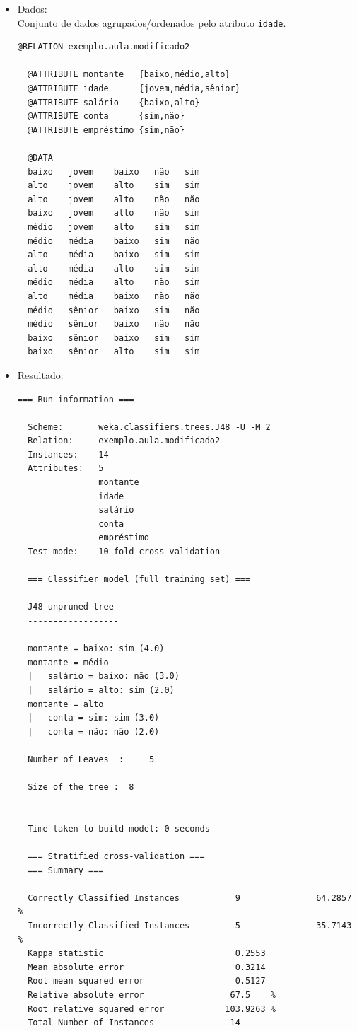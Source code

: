 \documentclass[
    article,            %
    11pt,               %
    oneside,            %
    a4paper,            %
    english,            %
    brazil,             %
    sumario=tradicional,
    ]{abntex2}
\begin{document}
\begin{itemize}
  \item Dados:\\
  Conjunto de dados agrupados/ordenados pelo atributo \texttt{idade}.
  \begin{Verbatim}[frame=single, fontsize=\tiny]
  @RELATION exemplo.aula.modificado2

  @ATTRIBUTE montante   {baixo,médio,alto}
  @ATTRIBUTE idade      {jovem,média,sênior}
  @ATTRIBUTE salário    {baixo,alto}
  @ATTRIBUTE conta      {sim,não}
  @ATTRIBUTE empréstimo {sim,não}

  @DATA
  baixo   jovem    baixo   não   sim 
  alto    jovem    alto    sim   sim 
  alto    jovem    alto    não   não 
  baixo   jovem    alto    não   sim 
  médio   jovem    alto    sim   sim 
  médio   média    baixo   sim   não 
  alto    média    baixo   sim   sim 
  alto    média    alto    sim   sim 
  médio   média    alto    não   sim 
  alto    média    baixo   não   não 
  médio   sênior   baixo   sim   não 
  médio   sênior   baixo   não   não 
  baixo   sênior   baixo   sim   sim 
  baixo   sênior   alto    sim   sim 
  \end{Verbatim}

  \item Resultado:
  \begin{Verbatim}[frame=single, fontsize=\tiny]
  === Run information ===

  Scheme:       weka.classifiers.trees.J48 -U -M 2
  Relation:     exemplo.aula.modificado2
  Instances:    14
  Attributes:   5
                montante
                idade
                salário
                conta
                empréstimo
  Test mode:    10-fold cross-validation

  === Classifier model (full training set) ===

  J48 unpruned tree
  ------------------

  montante = baixo: sim (4.0)
  montante = médio
  |   salário = baixo: não (3.0)
  |   salário = alto: sim (2.0)
  montante = alto
  |   conta = sim: sim (3.0)
  |   conta = não: não (2.0)

  Number of Leaves  :     5

  Size of the tree :  8


  Time taken to build model: 0 seconds

  === Stratified cross-validation ===
  === Summary ===

  Correctly Classified Instances           9               64.2857 %
  Incorrectly Classified Instances         5               35.7143 %
  Kappa statistic                          0.2553
  Mean absolute error                      0.3214
  Root mean squared error                  0.5127
  Relative absolute error                 67.5    %
  Root relative squared error            103.9263 %
  Total Number of Instances               14     


\end{Verbatim}
\end{itemize}
\end{document}
